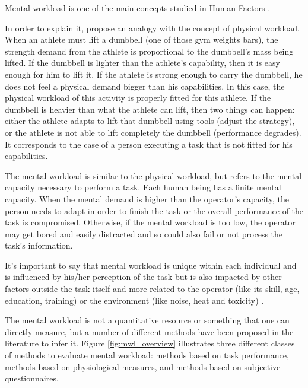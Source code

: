Mental workload is one of the main concepts studied in Human Factors \cite{stanton2004handbook}.

In order to explain it,  propose an analogy with the concept of physical workload. When an athlete must lift a dumbbell (one of those gym weights bars), the strength demand from the athlete is proportional to the dumbbell’s mass being lifted. If the dumbbell is lighter than the athlete’s capability, then it is easy enough for him to lift it. If the athlete is strong enough to carry the dumbbell, he does not feel a physical demand bigger than his capabilities. In this case, the physical workload of this activity is properly fitted for this athlete. If the dumbbell is heavier than what the athlete can lift, then two things can happen: either the athlete adapts to lift that dumbbell using tools (adjust the strategy), or the athlete is not able to lift completely the dumbbell (performance degrades). It corresponds to the case of a person executing a task that is not fitted for his capabilities.

The mental workload is similar to the physical workload, but refers to the mental capacity necessary to perform a task. Each human being has a finite mental capacity. When the mental demand is higher than the operator’s capacity, the person needs to adapt in order to finish the task or the overall performance of the task is compromised. Otherwise, if the mental workload is too low, the operator may get bored and easily distracted and so could also fail or not process the task’s information.

It’s important to say that mental workload is unique within each individual and is influenced by his/her perception of the task but is also impacted by other factors outside the task itself and more related to the operator (like its skill, age, education, training) or the environment (like noise, heat and toxicity)  \cite{cain2007review, fallahi2016effects, cardoso2012evaluation}.

The mental workload is not a quantitative resource or something that one can directly measure, but a number of different methods have been proposed in the literature to infer it. Figure \ref{fig:mwl_overview} illustrates three different classes of methods to evaluate mental workload: methods based on task performance, methods based on physiological measures, and methods based on subjective questionnaires.
        
        
    
